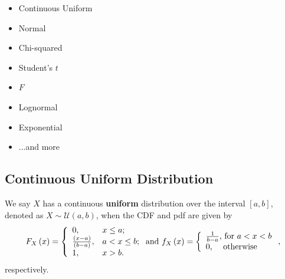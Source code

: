 \documentclass[notes=show,smaller]{beamer}\usepackage[]{graphicx}\usepackage[]{color}
\begin{document}
\begin{frame}{\secname}

\begin{itemize}
  \item Continuous Uniform
  \item Normal
  \item Chi-squared
  \item Student's $t$
  \item $F$
  \item Lognormal
  \item Exponential
  \item ...and more
  \end{itemize}
\end{frame}%

\subsection{Continuous Uniform Distribution}

\begin{frame}{\subsecname}

\begin{definition}
We say $X$ has a continuous \textbf{uniform} distribution over the
interval $[a,b]$, denoted as $X\sim \mathcal{U}(a,b)$, when the CDF and pdf are
given by
$$
{F_X\left( x\right)}=\left\{
                           \begin{array}{ll}
                             0, & \hbox{$x\leq a$;} \\
                             \frac{(x-a)}{(b-a)}, & \hbox{$a<x\leq b$;} \\
                             1, & \hbox{$x>b$.}
                           \end{array}
                         \right.\mbox{\color{black}and}~{f_{X}\left( x\right)} =\left\{
\begin{array}{l}
\frac{1}{b-a}\text{, for }a<x<b \\
0\text{, \quad otherwise}%
\end{array}%
\right. ,
$$
respectively.
\end{definition}
\end{frame}%
\end{document}

